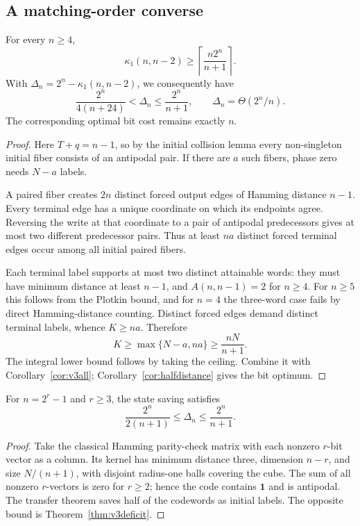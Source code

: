 \subsection{A matching-order converse}

\begin{theorem}[Sharp state-deficit order at $q=n-2$]\label{thm:v3deficit}
For every $n\ge4$,
\[
 \boxed{\quad \kappa_1(n,n-2)\ge
 \left\lceil\frac{n2^n}{n+1}\right\rceil.\quad}
\]
With $\Delta_n=2^n-\kappa_1(n,n-2)$, we consequently have
\[
 \boxed{\quad \frac{2^n}{4(n+24)}<\Delta_n\le
 \frac{2^n}{n+1},\qquad \Delta_n=\Theta(2^n/n).\quad}
\]
The corresponding optimal bit cost remains exactly $n$.
\end{theorem}
\begin{proof}
Here $T+q=n-1$, so by the initial collision lemma every non-singleton initial fiber consists of an antipodal pair. If there are $a$ such fibers, phase zero needs $N-a$ labels.

A paired fiber creates $2n$ distinct forced output edges of Hamming distance $n-1$. Every terminal edge has a unique coordinate on which its endpoints agree. Reversing the write at that coordinate to a pair of antipodal predecessors gives at most two different predecessor pairs. Thus at least $na$ distinct forced terminal edges occur among all initial paired fibers.

Each terminal label supports at most two distinct attainable words: they must have minimum distance at least $n-1$, and $A(n,n-1)=2$ for $n\ge4$. For $n\ge5$ this follows from the Plotkin bound, and for $n=4$ the three-word case fails by direct Hamming-distance counting. Distinct forced edges demand distinct terminal labels, whence $K\ge na$. Therefore
\[
 K\ge\max\{N-a,na\}\ge\frac{nN}{n+1}.
\]
The integral lower bound follows by taking the ceiling. Combine it with Corollary~\ref{cor:v3all}; Corollary~\ref{cor:halfdistance} gives the bit optimum.
\end{proof}

\begin{corollary}\label{cor:v3hamming}
For $n=2^r-1$ and $r\ge3$, the state saving satisfies
\[
 \boxed{\qquad \frac{2^n}{2(n+1)}\le\Delta_n
 \le\frac{2^n}{n+1}.\qquad}
\]
\end{corollary}
\begin{proof}
Take the classical Hamming parity-check matrix with each nonzero $r$-bit vector as a column. Its kernel has minimum distance three, dimension $n-r$, and size $N/(n+1)$, with disjoint radius-one balls covering the cube. The sum of all nonzero $r$-vectors is zero for $r\ge2$; hence the code contains $\mathbf1$ and is antipodal. The transfer theorem saves half of the codewords as initial labels. The opposite bound is Theorem~\ref{thm:v3deficit}.
\end{proof}

